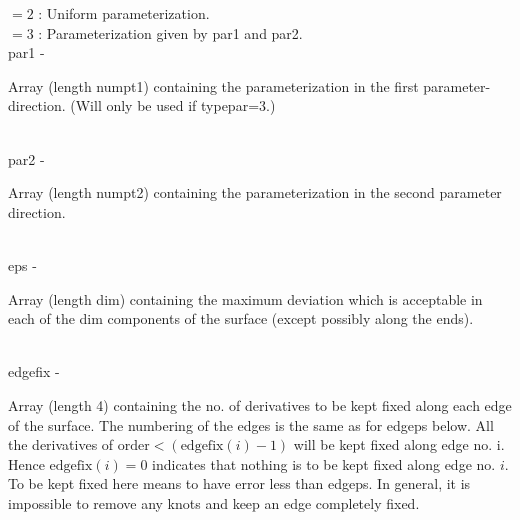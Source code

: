                 \>\>\>\>\>      $= 2$ : \>Uniform parameterization.\\
                \>\>\>\>\>      $= 3$ : \>Parameterization given by par1 and par2.\\
        \>\>    {\fov par1}\> - \>      \begin{minipg2}
                                Array (length numpt1) containing the parameterization in
                                the first parameter-direction. (Will only be used if
                                typepar=3.)
                                \end{minipg2}\\[0.3ex]
        \>\>    {\fov par2}\> - \>      \begin{minipg2}
                                Array (length numpt2) containing the parameterization in the
                                second parameter direction.
                                \end{minipg2}\\[0.8ex]
        \>\>    {\fov eps}\> - \>               \begin{minipg2}
                                Array (length dim) containing the maximum
                                deviation which is acceptable in each of the dim
                                components of the surface (except possibly along the
                                ends).
                                \end{minipg2}\\[0.3ex]
        \>\>    {\fov edgefix}\> - \>   \begin{minipg2}
                                Array (length 4) containing the no. of derivatives to
                                be kept fixed along each edge of the surface. The
                                numbering of the edges is the same as for edgeps
                                below. All the derivatives of
                                $\mbox{order}<(\mbox{edgefix}(i)-1)$ will
                                be kept fixed along edge no. i.
                                Hence $\mbox{edgefix}(i)=0$
                                indicates that nothing is to be kept fixed along edge
                                no. $i$. To be kept fixed here means to have error less
                                than edgeps. In general, it is impossible to  remove
                                any knots and keep an edge completely fixed.
                                \end{minipg2}\\[0.8ex]
